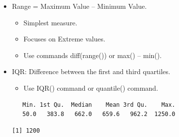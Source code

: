 \documentclass[
  letterpaper,
  DIV=11,
  numbers=noendperiod]{scrreprt}
\newenvironment{Shaded}{\begin{snugshade}}{\end{snugshade}}
\newcommand{\AttributeTok}[1]{\textcolor[rgb]{0.40,0.45,0.13}{#1}}
\newcommand{\ConstantTok}[1]{\textcolor[rgb]{0.56,0.35,0.01}{#1}}
\newcommand{\FunctionTok}[1]{\textcolor[rgb]{0.28,0.35,0.67}{#1}}
\newcommand{\NormalTok}[1]{\textcolor[rgb]{0.00,0.23,0.31}{#1}}
\newcommand{\SpecialCharTok}[1]{\textcolor[rgb]{0.37,0.37,0.37}{#1}}
\providecommand{\tightlist}{%
  \setlength{\itemsep}{0pt}\setlength{\parskip}{0pt}}\usepackage{longtable,booktabs,array}
\begin{document}
\begin{itemize}
\item
  Range = Maximum Value -- Minimum Value.

  \begin{itemize}
  \tightlist
  \item
    Simplest measure.
  \item
    Focuses on Extreme values.
  \item
    Use commands diff(range()) or max() -- min().
  \end{itemize}
\item
  IQR: Difference between the first and third quartiles.

  \begin{itemize}
  \tightlist
  \item
    Use IQR() command or quantile() command.
  \end{itemize}

\begin{Shaded}
\end{Shaded}

\begin{verbatim}
   Min. 1st Qu.  Median    Mean 3rd Qu.    Max. 
   50.0   383.8   662.0   659.6   962.2  1250.0 
\end{verbatim}

\begin{Shaded}
\end{Shaded}

\begin{verbatim}
[1] 1200
\end{verbatim}

\begin{Shaded}
\end{Shaded}


\end{itemize}
\end{document}
